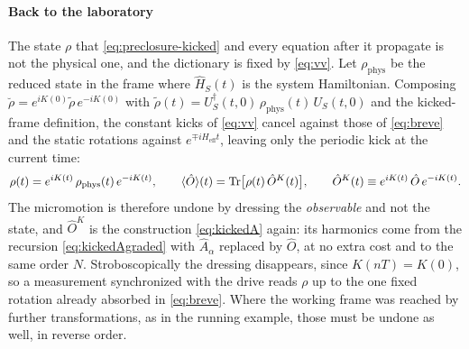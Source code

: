 \documentclass[a4paper,11pt]{article}
\newcommand{\eff}{\mathrm{eff}}
\begin{document}
\paragraph{Back to the laboratory}
The state $\rho$ that \eqref{eq:preclosure-kicked} and every equation after it propagate is not the physical one, and the dictionary is fixed by \eqref{eq:vv}. Let $\rho_{\mathrm{phys}}$ be the reduced state in the frame where $\hat H_S(t)$ is the system Hamiltonian. Composing $\breve\rho = e^{iK(0)}\tilde\rho\,e^{-iK(0)}$ with $\tilde\rho(t) = U_S^\dagger(t,0)\,\rho_{\mathrm{phys}}(t)\,U_S(t,0)$ and the kicked-frame definition, the constant kicks of \eqref{eq:vv} cancel against those of \eqref{eq:breve} and the static rotations against $e^{\mp iH_\eff t}$, leaving only the periodic kick at the current time:
\begin{equation}\label{eq:frames}
  \rho(t) = e^{iK(t)}\,\rho_{\mathrm{phys}}(t)\,e^{-iK(t)},
  \qquad
  \langle\hat O\rangle(t) = \Tr\!\big[\rho(t)\,\hat O^K(t)\big],
  \qquad
  \hat O^K(t) \equiv e^{iK(t)}\,\hat O\,e^{-iK(t)} .
\end{equation}
The micromotion is therefore undone by dressing the \emph{observable} and not the state, and $\hat O^K$ is the construction \eqref{eq:kickedA} again: its harmonics come from the recursion \eqref{eq:kickedAgraded} with $\hat A_\alpha$ replaced by $\hat O$, at no extra cost and to the same order $N$. Stroboscopically the dressing disappears, since $K(nT) = K(0)$, so a measurement synchronized with the drive reads $\rho$ up to the one fixed rotation already absorbed in \eqref{eq:breve}. Where the working frame was reached by further transformations, as in the running example, those must be undone as well, in reverse order.
\end{document}
